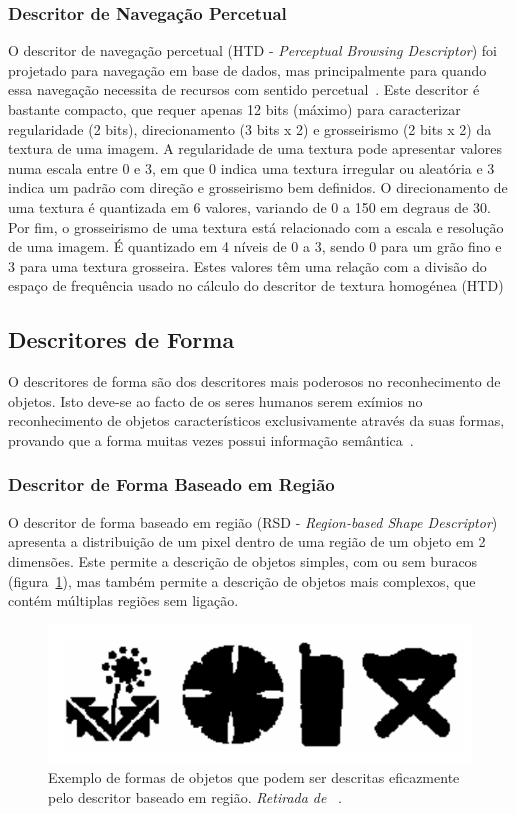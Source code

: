 \subsubsection{Descritor de Navegação Percetual}

O descritor de navegação percetual (HTD - \textit{Perceptual Browsing Descriptor}) foi projetado para navegação em base de dados, mas principalmente para quando essa navegação necessita de recursos com sentido percetual~\cite{Wu2001}. Este descritor é bastante compacto, que requer apenas 12 bits (máximo) para caracterizar regularidade (2 bits), direcionamento (3 bits x 2) e grosseirismo (2 bits x 2) da textura de uma imagem. A regularidade de uma textura pode apresentar valores numa escala entre 0 e 3, em que 0 indica uma textura irregular ou aleatória e 3 indica um padrão com direção e grosseirismo bem definidos. O direcionamento de uma textura é quantizada em 6 valores, variando de 0 a 150 em degraus de 30. Por fim, o grosseirismo de uma textura está relacionado com a escala e resolução de uma imagem. É quantizado em 4 níveis de 0 a 3, sendo 0 para um grão fino e 3 para uma textura grosseira. Estes valores têm uma relação com a divisão do espaço de frequência usado no cálculo do descritor de textura homogénea (HTD)~\cite{Manjunath2001}

\subsection{Descritores de Forma}

O descritores de forma são dos descritores mais poderosos no reconhecimento de objetos. Isto deve-se ao facto de os seres humanos serem exímios no reconhecimento de objetos característicos exclusivamente através da suas formas, provando que a forma muitas vezes possui informação semântica~\cite{Bober2001}.  

\subsubsection{Descritor de Forma Baseado em Região}
O descritor de forma baseado em região (RSD - \textit{Region-based Shape Descriptor})~\cite{Bober2001} apresenta a distribuição de um pixel dentro de uma região de um objeto em 2 dimensões. Este permite a descrição de objetos simples, com ou sem buracos (figura~\ref{fig:shape1}), mas também permite a descrição de objetos mais complexos, que contém múltiplas regiões sem ligação.

\begin{figure}[h]
\centering
\includegraphics[width=0.7\linewidth]{./figures/shape1}
\caption{Exemplo de formas de objetos que podem ser descritas eficazmente pelo descritor baseado em região. \textit{Retirada de}~\cite{Bober2001} .}
\label{fig:shape1}
\end{figure}

